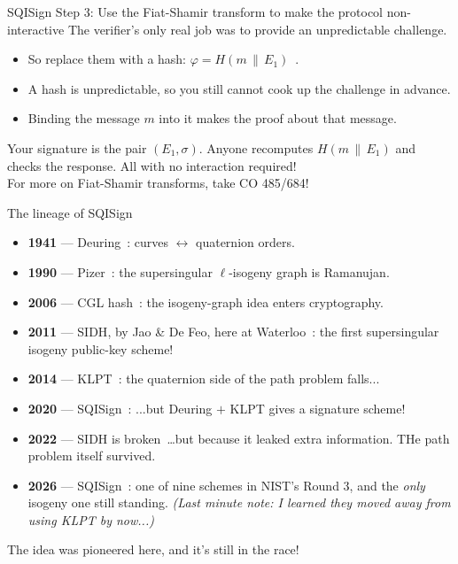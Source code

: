 \documentclass[10pt,aspectratio=169]{beamer}
\begin{document}
\begin{frame}{SQISign Step 3: Use the Fiat-Shamir transform to make the protocol non-interactive}
  The verifier's only real job was to provide an unpredictable challenge.
  \begin{itemize}
    \item So replace them with a hash: $\varphi = H(m \,\|\, E_1)$~\cite{fs}.
    \item A hash is unpredictable, so you still cannot cook up the challenge in advance.
    \item Binding the message $m$ into it makes the proof \alert{about that message}.
  \end{itemize}
  \vspace{0.8em}
  Your signature is the pair $(E_1, \sigma)$. Anyone recomputes $H(m \,\|\, E_1)$ and checks the
  response. All with no interaction required! \\
  \vspace{0.8em}
  For more on Fiat-Shamir transforms, take CO 485/684!
\end{frame}

\begin{frame}{The lineage of SQISign}
  \begin{itemize}
    \item \textbf{1941} --- \alert{Deuring}~\cite{deuring}: curves $\leftrightarrow$ quaternion orders.
    \item \textbf{1990} --- \alert{Pizer}~\cite{pizer}: the supersingular $\ell$-isogeny graph is Ramanujan.
    \item \textbf{2006} --- \alert{CGL} hash~\cite{cgl}: the isogeny-graph idea enters cryptography.
    \item \textbf{2011} --- \alert{SIDH}, by \alert{Jao \& De Feo, here at Waterloo}~\cite{sidh}: the first supersingular
          isogeny public-key scheme!
    \item \textbf{2014} --- \alert{KLPT}~\cite{klpt}: the quaternion side of the path problem falls...
    \item \textbf{2020} --- \alert{SQISign}~\cite{sqisign}: ...but Deuring $+$ KLPT gives a signature scheme!
    \item \textbf{2022} --- \alert{SIDH} is broken~\cite{cd}\ldots but because it leaked extra information.
          THe path problem itself survived.
    \item \textbf{2026} --- \alert{SQISign}~\cite{nistir8610}: one of nine schemes in NIST's Round 3, and the
          \emph{only} isogeny one still standing. \emph{(Last minute note: I learned they moved away from using KLPT by now...)}
  \end{itemize}
  \vspace{0.4em}
  \centering\small The idea was pioneered here, and it's still in the race!
\end{frame}
\end{document}
